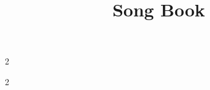 \documentclass[a4paper]{article}
\title{Song Book}
\begin{document}
\maketitle

\listoftunes

\vfill

\begin{multicols}{2}
\listofreels
\columnbreak
\listofjigs
\end{multicols}

\pagebreak

\begin{multicols}{2}
\listofhornpipes
\listofpolkas
\listofstrathspeys
\listofmarches
\columnbreak
\listofslipjigs
\listofslides
\listofwaltzes
\end{multicols}

\pagebreak
\end{document}
